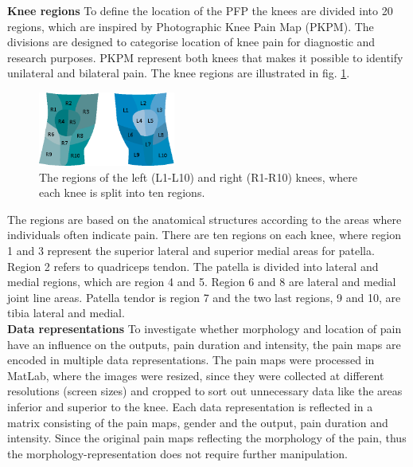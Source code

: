 \noindent
\textbf{Knee regions} \newline
\noindent
To define the location of the PFP the knees are divided into 20 regions, which are inspired by Photographic Knee Pain Map (PKPM). The divisions are designed to categorise location of knee pain for diagnostic and research purposes. PKPM represent both knees that makes it possible to identify unilateral and bilateral pain.\citep{Elson2010} The knee regions are illustrated in fig. \ref{fig:atlas}.

\begin{figure} [H] 
\centering
\includegraphics[width=0.4\textwidth]{Figures/atlas}
\caption{The regions of the left (L1-L10) and right (R1-R10) knees, where each knee is split into ten regions.}
\label{fig:atlas}
\end{figure}

\noindent
The regions are based on the anatomical structures according to the areas where individuals often indicate pain.
There are ten regions on each knee, where region 1 and 3 represent the superior lateral and superior medial areas for patella. Region 2 refers to quadriceps tendon. The patella is divided into lateral and medial regions, which are region 4 and 5. Region 6 and 8 are lateral and medial joint line areas. Patella tendor is region 7 and the two last regions, 9 and 10, are tibia lateral and medial.\citep{Elson2010}\\

\noindent
\textbf{Data representations} \newline
\noindent
To investigate whether morphology and location of pain have an influence on the outputs, pain duration and intensity, the pain maps are encoded in multiple data representations. The pain maps were processed in MatLab, where the images were resized, since they were collected at different resolutions (screen sizes) and cropped to sort out unnecessary data like the areas inferior and superior to the knee.  Each data representation is reflected in a matrix consisting of the pain maps, gender and the output, pain duration and intensity. Since the original pain maps reflecting the morphology of the pain, thus the morphology-representation does not require further manipulation. \newline

